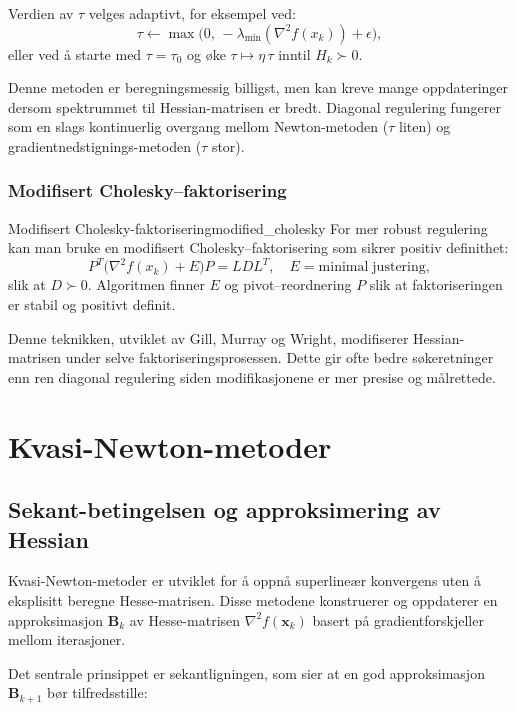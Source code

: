 Verdien av $\tau$ velges adaptivt, for eksempel ved:
\[
	\tau \leftarrow \max\bigl(0,\,-\lambda_{\min}(\nabla^2 f(x_k)) + \epsilon\bigr),
\]
eller ved å starte med $\tau=\tau_0$ og øke $\tau\mapsto\eta\,\tau$ inntil $H_k\succ0$.

Denne metoden er beregningsmessig billigst, men kan kreve mange oppdateringer dersom spektrummet til Hessian-matrisen er bredt. Diagonal regulering fungerer som en slags kontinuerlig overgang mellom Newton-metoden ($\tau$ liten) og gradientnedstignings-metoden ($\tau$ stor).

\subsubsection{Modifisert Cholesky--faktorisering}
\begin{theorem}{Modifisert Cholesky-faktorisering}{modified_cholesky}
	For mer robust regulering kan man bruke en modifisert Cholesky--faktorisering som sikrer positiv definithet:
	\[
		P^T\bigl(\nabla^2 f(x_k)+E\bigr)P = LDL^T,\quad E=\mathrm{minimal\;justering},
	\]
	slik at $D\succ0$. Algoritmen finner $E$ og pivot--reordnering $P$ slik at faktoriseringen er stabil og positivt definit.
\end{theorem}

Denne teknikken, utviklet av Gill, Murray og Wright, modifiserer Hessian-matrisen under selve faktoriseringsprosessen. Dette gir ofte bedre søkeretninger enn ren diagonal regulering siden modifikasjonene er mer presise og målrettede.

\section{Kvasi-Newton-metoder}
\label{sec:quasi_newton}

\subsection{Sekant-betingelsen og approksimering av Hessian}
\label{subsec:secant_condition}

Kvasi-Newton-metoder er utviklet for å oppnå superlineær konvergens uten å eksplisitt beregne Hesse-matrisen. Disse metodene konstruerer og oppdaterer en approksimasjon \(\symbf{B}_k\) av Hesse-matrisen \(\nabla^2 f(\symbf{x}_k)\) basert på gradientforskjeller mellom iterasjoner.

Det sentrale prinsippet er sekantligningen, som sier at en god approksimasjon \(\symbf{B}_{k+1}\) bør tilfredsstille:

